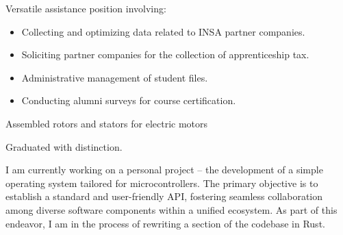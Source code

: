 \documentclass[10pt,a4paper,ragged2e,withhyper]{./AltaCV/altacv}
\begin{document}



\makecvheader



\begin{paracol}{2}


  Versatile assistance position involving:
  \begin{itemize}
  \item Collecting and optimizing data related to INSA partner companies.
  \item Soliciting partner companies for the collection of apprenticeship tax.
  \item Administrative management of student files.
  \item Conducting alumni surveys for course certification.
  \end{itemize}

  \divider


  Assembled rotors and stators for electric motors

  \smallskip



  \divider

  Graduated with distinction.

  \divider


  \smallskip


  I am currently working on a personal project – the development of a simple operating system tailored for microcontrollers.
  The primary objective is to establish a standard and user-friendly API, fostering seamless collaboration among diverse software components within a unified ecosystem.
  As part of this endeavor, I am in the process of rewriting a section of the codebase in Rust.


\end{paracol}
\end{document}
